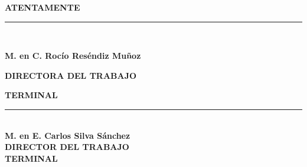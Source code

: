 \begin{titlepage}
    


    \raggedright \textbf{ATENTAMENTE}\\
    \vspace{2.0cm}
    \raggedright \rule{60mm}{0.1mm}\\
    \raggedright \small \textbf {M. en C. Rocío Reséndiz Muñoz}\\
    \raggedright \small \textbf {DIRECTORA DEL TRABAJO} \\
    \raggedright \small \textbf{TERMINAL} \\
    \vspace{-1.6cm}
    \raggedleft \rule {60mm}{0.1mm}\\
    \raggedleft \small \textbf {M. en E. Carlos Silva Sánchez}\\
    \raggedleft \small \textbf {DIRECTOR DEL TRABAJO}  \\
    \raggedleft \small \textbf {TERMINAL} 
   

    \end{titlepage}
